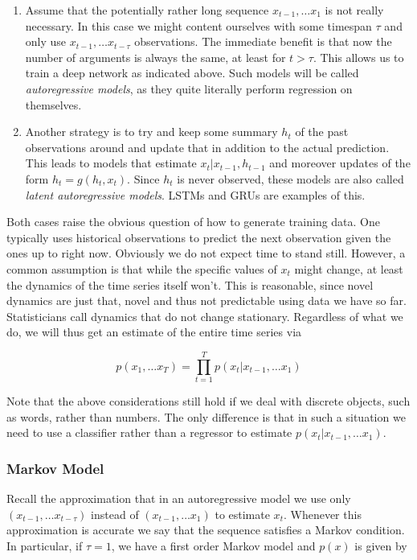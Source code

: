 \begin{enumerate}
    \item Assume that the potentially rather long sequence $x_{t-1}, \ldots x_1$ is not really necessary. In this case we might content ourselves with some timespan $\tau$ and only use $x_{t-1}, \ldots x_{t-\tau}$ observations. The immediate benefit is that now the number of arguments is always the same, at least for $t > \tau$. This allows us to train a deep network as indicated above. Such models will be called \textit{autoregressive models}, as they quite literally perform regression on themselves.
    \item Another strategy is to try and keep some summary $h_t$ of the past observations around and update that in addition to the actual prediction. This leads to models that estimate $x_t|x_{t-1}, h_{t-1}$ and moreover updates of the form $h_t = g(h_t, x_t)$. Since $h_t$ is never observed, these models are also called \textit{latent autoregressive models}. LSTMs and GRUs are examples of this.
\end{enumerate}

Both cases raise the obvious question of how to generate training data. One typically uses historical observations to predict the next observation given the ones up to right now. Obviously we do not expect time to stand still. However, a common assumption is that while the specific values of $x_t$ might change, at least the dynamics of the time series itself won’t. This is reasonable, since novel dynamics are just that, novel and thus not predictable using data we have so far. Statisticians call dynamics that do not change stationary. Regardless of what we do, we will thus get an estimate of the entire time series via

$$p(x_1, \ldots x_T) = \prod_{t=1}^T p(x_t|x_{t-1}, \ldots x_1)$$

Note that the above considerations still hold if we deal with discrete objects, such as words, rather than numbers. The only difference is that in such a situation we need to use a classifier rather than a regressor to estimate $p(x_t| x_{t-1}, \ldots x_1)$.

\subsubsection{Markov Model}

Recall the approximation that in an autoregressive model we use only $(x_{t-1}, \ldots x_{t-\tau})$ instead of $(x_{t-1}, \ldots x_1)$ to estimate $x_t$. Whenever this approximation is accurate we say that the sequence satisfies a Markov condition. In particular, if $\tau = 1$, we have a first order Markov model and $p(x)$ is given by

